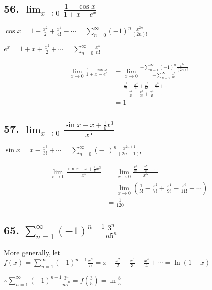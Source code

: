 \documentclass{article}
\begin{document}
    \subsection*{56. $\lim_{x\to 0}\frac{1 - \cos x}{1 + x - e^x}$}

    $\cos x = 1 - \frac{x^2}{2} + \frac{x^4}{4!} - \cdots = \sum_{n=0}^\infty (-1)^n \frac{x^{2n}}{(2n)!}$

    $e^x = 1 + x + \frac{x^2}{2} + \cdots = \sum_{n=0}^\infty \frac{x^n}{n!}$

    $$\begin{aligned}
        \lim_{x\to 0}\frac{1 - \cos x}{1 + x - e^x} &= \lim_{x\to 0}\frac{-\sum_{n=1}^\infty (-1)^n \frac{x^{2n}}{(2n)!}}{-\sum_{n=2}^\infty \frac{x^n}{n!}} \\
        &= \frac{\frac{x^2}{2!} - \frac{x^4}{4!} + \frac{x^6}{6!} - \frac{x^8}{8!} + \cdots}{\frac{x^2}{2!} + \frac{x^3}{3!} + \frac{x^4}{4!} + \cdots} \\
        &= 1
    \end{aligned}$$

    \subsection*{57. $\lim_{x\to 0}\frac{\sin x - x + \frac 1 6 x^3}{x^5}$}

    $\sin x = x - \frac{x^3}{3!} + \cdots = \sum_{n=0}^\infty (-1)^n \frac{x^{2n+1}}{(2n+1)!}$

    $$\begin{aligned}
        \lim_{x\to 0}\frac{\sin x - x + \frac 1 6 x^3}{x^5} &= \lim_{x\to 0}\frac{\frac{x^5}{5!} - \frac{x^7}{7!} + \cdots}{x^5} \\
        &= \lim_{x\to 0}(\frac{1}{5!} - \frac{x^2}{7!} + \frac{x^4}{9!} - \frac{x^6}{11!} + \cdots) \\
        &= \frac{1}{120} 
    \end{aligned}$$

    \subsection*{65. $\sum_{n=1}^\infty (-1)^{n-1} \frac{3^n}{n 5^n}$}

    More generally, let $f(x) = \sum_{n=1}^\infty (-1)^{n-1} \frac{x^n}{n} = x - \frac{x^2}{2} + \frac{x^3}{3} - \frac{x^4}{4} + \cdots = \ln (1 + x)$

    $\therefore \sum_{n=1}^\infty (-1)^{n-1} \frac{3^n}{n 5^n} = f(\frac 3 5) = \ln \frac 8 5$
\end{document}
